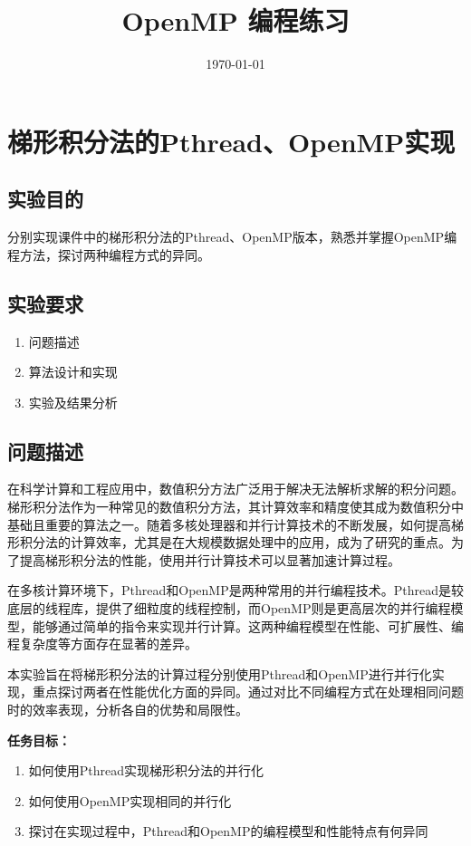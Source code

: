\documentclass{nku}
\title{OpenMP 编程练习}
\date{\today}
\begin{document}
\makecover
\tableofcontents
\newpage
\makeheader

\section{梯形积分法的Pthread、OpenMP实现}
\subsection{实验目的}
分别实现课件中的梯形积分法的Pthread、OpenMP版本，熟悉并掌握OpenMP编程方法，探讨两种编程方式的异同。

\subsection{实验要求}
\begin{enumerate}
    \item 问题描述
    \item 算法设计和实现
    \item 实验及结果分析
\end{enumerate}

\subsection{问题描述}
在科学计算和工程应用中，数值积分方法广泛用于解决无法解析求解的积分问题。梯形积分法作为一种常见的数值积分方法，其计算效率和精度使其成为数值积分中基础且重要的算法之一。随着多核处理器和并行计算技术的不断发展，如何提高梯形积分法的计算效率，尤其是在大规模数据处理中的应用，成为了研究的重点。为了提高梯形积分法的性能，使用并行计算技术可以显著加速计算过程。

在多核计算环境下，Pthread和OpenMP是两种常用的并行编程技术。Pthread是较底层的线程库，提供了细粒度的线程控制，而OpenMP则是更高层次的并行编程模型，能够通过简单的指令来实现并行计算。这两种编程模型在性能、可扩展性、编程复杂度等方面存在显著的差异。

本实验旨在将梯形积分法的计算过程分别使用Pthread和OpenMP进行并行化实现，重点探讨两者在性能优化方面的异同。通过对比不同编程方式在处理相同问题时的效率表现，分析各自的优势和局限性。

\textbf{任务目标：}
\begin{enumerate}
    \item 如何使用Pthread实现梯形积分法的并行化
    \item 如何使用OpenMP实现相同的并行化
    \item 探讨在实现过程中，Pthread和OpenMP的编程模型和性能特点有何异同
\end{enumerate}
\end{document}
